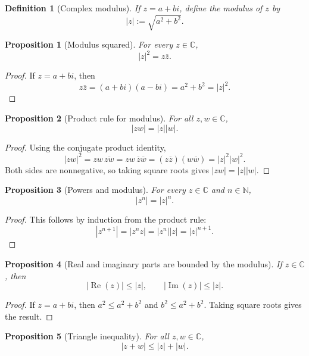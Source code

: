 \documentclass[11pt]{article}
\newtheorem{definition}{Definition}[section]
\newtheorem{proposition}{Proposition}[section]
\newcommand{\C}{\mathbb{C}}
\newcommand{\N}{\mathbb{N}}
\newcommand{\abs}[1]{\left|#1\right|}
\newcommand{\conj}[1]{\overline{#1}}
\newcommand{\Real}{\operatorname{Re}}
\newcommand{\Imag}{\operatorname{Im}}
\begin{document}
\begin{definition}[Complex modulus]
If $z=a+bi$, define the modulus of $z$ by
\[
  \abs{z}:=\sqrt{a^{2}+b^{2}}.
\]
\end{definition}

\begin{proposition}[Modulus squared]
For every $z\in\C$,
\[
  \abs{z}^{2}=z\conj{z}.
\]
\end{proposition}

\begin{proof}
If $z=a+bi$, then
\[
  z\conj{z}=(a+bi)(a-bi)=a^{2}+b^{2}=\abs{z}^{2}.
\]
\end{proof}

\begin{proposition}[Product rule for modulus]
For all $z,w\in\C$,
\[
  \abs{zw}=\abs{z}\abs{w}.
\]
\end{proposition}

\begin{proof}
Using the conjugate product identity,
\[
  \abs{zw}^{2}
  = zw\,\conj{zw}
  = zw\,\conj{z}\conj{w}
  = (z\conj{z})(w\conj{w})
  = \abs{z}^{2}\abs{w}^{2}.
\]
Both sides are nonnegative, so taking square roots gives $\abs{zw}=\abs{z}\abs{w}$.
\end{proof}

\begin{proposition}[Powers and modulus]
For every $z\in\C$ and $n\in\N$,
\[
  \abs{z^{n}}=\abs{z}^{n}.
\]
\end{proposition}

\begin{proof}
This follows by induction from the product rule:
\[
  \abs{z^{n+1}}=\abs{z^{n}z}=\abs{z^{n}}\abs{z}=\abs{z}^{n+1}.
\]
\end{proof}

\begin{proposition}[Real and imaginary parts are bounded by the modulus]
If $z\in\C$, then
\[
  \abs{\Real(z)}\le \abs{z},
  \qquad
  \abs{\Imag(z)}\le \abs{z}.
\]
\end{proposition}

\begin{proof}
If $z=a+bi$, then $a^{2}\le a^{2}+b^{2}$ and $b^{2}\le a^{2}+b^{2}$.
Taking square roots gives the result.
\end{proof}

\begin{proposition}[Triangle inequality]
For all $z,w\in\C$,
\[
  \abs{z+w}\le \abs{z}+\abs{w}.
\]
\end{proposition}
\end{document}
